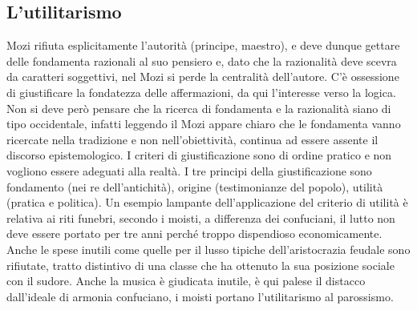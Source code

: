 \documentclass[10pt,a4paper]{report}
\begin{document}
\subsection{L'utilitarismo}
Mozi rifiuta esplicitamente l'autorità (principe, maestro), e deve dunque gettare delle fondamenta razionali al suo pensiero e, dato che la razionalità deve scevra da caratteri soggettivi, nel Mozi si perde la centralità dell'autore. C'è ossessione di giustificare la fondatezza delle affermazioni, da qui l'interesse verso la logica. Non si deve però pensare che la ricerca di fondamenta e la razionalità siano di tipo occidentale, infatti leggendo il Mozi appare chiaro che le fondamenta vanno ricercate nella tradizione e non nell'obiettività, continua ad essere assente il discorso epistemologico. I criteri di giustificazione sono di ordine pratico e non vogliono essere adeguati alla realtà. I tre principi della giustificazione sono fondamento (nei re dell'antichità), origine (testimonianze del popolo), utilità (pratica e politica). Un esempio lampante dell'applicazione del criterio di utilità è relativa ai riti funebri, secondo i moisti, a differenza dei confuciani, il lutto non deve essere portato per tre anni perché troppo dispendioso economicamente. Anche le spese inutili come quelle per il lusso tipiche dell'aristocrazia feudale sono rifiutate, tratto distintivo di una classe che ha ottenuto la sua posizione sociale con il sudore. Anche la musica è giudicata inutile, è qui palese il distacco dall'ideale di armonia confuciano, i moisti portano l'utilitarismo al parossismo.
\end{document}
